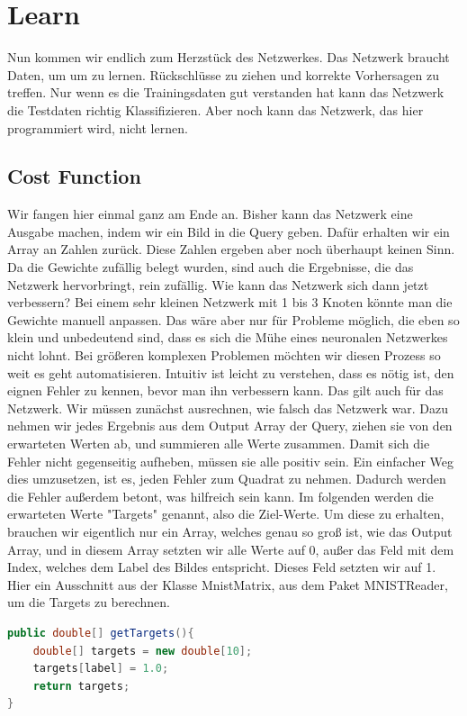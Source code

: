 \documentclass[12pt]{article}
\begin{document}
\section{Learn}Nun kommen wir endlich zum Herzstück des Netzwerkes. Das Netzwerk braucht Daten, um um zu lernen. Rückschlüsse zu ziehen und korrekte Vorhersagen zu treffen. Nur wenn es die Trainingsdaten gut verstanden hat kann das Netzwerk die Testdaten richtig Klassifizieren. Aber noch kann das Netzwerk, das hier programmiert wird, nicht lernen.
\subsection{Cost Function}Wir fangen hier einmal ganz am Ende an. Bisher kann das Netzwerk eine Ausgabe machen, indem wir ein Bild in die Query geben. Dafür erhalten wir ein Array an Zahlen zurück. Diese Zahlen ergeben aber noch überhaupt keinen Sinn. Da die Gewichte zufällig belegt wurden, sind auch die Ergebnisse, die das Netzwerk hervorbringt, rein zufällig. 
Wie kann das Netzwerk sich dann jetzt verbessern? Bei einem sehr kleinen Netzwerk mit 1 bis 3 Knoten könnte man die Gewichte manuell anpassen. Das wäre aber nur für Probleme möglich, die eben so klein und unbedeutend sind, dass es sich die Mühe eines neuronalen Netzwerkes nicht lohnt. Bei größeren komplexen Problemen möchten wir diesen Prozess so weit es geht automatisieren.
Intuitiv ist leicht zu verstehen, dass es nötig ist, den eignen Fehler zu kennen, bevor man ihn verbessern kann. Das gilt auch für das Netzwerk. Wir müssen zunächst ausrechnen, wie falsch das Netzwerk war. Dazu nehmen wir jedes Ergebnis aus dem Output Array der Query, ziehen sie von den erwarteten Werten ab, und summieren alle Werte zusammen. Damit sich die Fehler nicht gegenseitig aufheben, müssen sie alle positiv sein. Ein einfacher Weg dies umzusetzen, ist es, jeden Fehler zum Quadrat zu nehmen. Dadurch werden die Fehler außerdem betont, was hilfreich sein kann. Im folgenden werden die erwarteten Werte "Targets" genannt, also die Ziel-Werte. Um diese zu erhalten, brauchen wir eigentlich nur ein Array, welches genau so groß ist, wie das Output Array, und in diesem Array setzten wir alle Werte auf 0, außer das Feld mit dem Index, welches dem Label des Bildes entspricht. Dieses Feld setzten wir auf 1. Hier ein Ausschnitt aus der Klasse MnistMatrix, aus dem Paket MNISTReader, um die Targets zu berechnen.
\begin{lstlisting}[language=Java]
public double[] getTargets(){
    double[] targets = new double[10];
    targets[label] = 1.0;
    return targets;
} 
\end{lstlisting}
\end{document}
